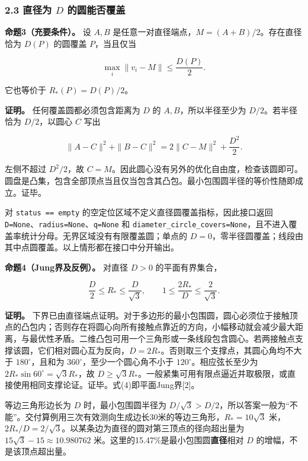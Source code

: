 \documentclass[
  11pt,
  fontset=none]{ctexart}
\begin{document}
\subsubsection{\texorpdfstring{2.3 直径为 \(D\)
的圆能否覆盖}{2.3 直径为 D 的圆能否覆盖}}\label{ux76f4ux5f84ux4e3a-d-ux7684ux5706ux80fdux5426ux8986ux76d6}

\textbf{命题3（充要条件）。} 设 \(A,B\)
是任意一对直径端点，\(M=(A+B)/2\)。存在直径恰为 \(D(P)\) 的圆覆盖
\(P\)，当且仅当

\[
\max_i\|v_i-M\|\le\frac{D(P)}2. \tag{3}
\]

它也等价于 \(R_{\text{*}}(P)=D(P)/2\)。

\textbf{证明。} 任何覆盖圆都必须包含距离为 \(D\) 的
\(A,B\)，所以半径至少为 \(D/2\)。若半径恰为 \(D/2\)，以圆心 \(C\) 写出

\[
\|A-C\|^2+\|B-C\|^2=2\|C-M\|^2+\frac{D^2}{2}.
\]

左侧不超过 \(D^2/2\)，故
\(C=M\)。因此圆心没有另外的优化自由度，检查该圆即可。圆盘是凸集，包含全部顶点当且仅当包含其凸包。最小包围圆半径的等价性随即成立。证毕。

对 \texttt{status\ ==\ \textquotesingle{}empty\textquotesingle{}}
的空定位区域不定义直径圆覆盖指标，因此接口返回
\texttt{D=None}、\texttt{radius=None}、\texttt{q=None} 和
\texttt{diameter\_circle\_covers=None}，且不进入覆盖率统计分母。无界区域没有有限覆盖圆；单点的
\(D=0\)，零半径圆覆盖；线段由其中点圆覆盖。以上情形都在接口中分开输出。

\textbf{命题4（Jung界及反例）。} 对直径 \(D>0\) 的平面有界集合，

\[
\frac D2\le R_{\text{*}}\le\frac D{\sqrt3},\qquad
1\le\frac{2R_{\text{*}}}{D}\le\frac2{\sqrt3}. \tag{4}
\]

\textbf{证明。}
下界已由直径端点证明。对于多边形的最小包围圆，圆心必须位于接触顶点的凸包内；否则存在将圆心向所有接触点靠近的方向，小幅移动就会减少最大距离，与最优性矛盾。二维凸包可用一个三角形或一条线段包含圆心。若两接触点支撑该圆，它们相对圆心互为反向，\(D=2R_{\text{*}}\)。否则取三个支撑点，其圆心角均不大于
\(180^\circ\)，且和为 \(360^\circ\)，至少一个圆心角不小于
\(120^\circ\)。相应弦长至少为
\(2R_{\text{*}}\sin60^\circ=\sqrt3R_{\text{*}}\)，故
\(D\ge\sqrt3R_{\text{*}}\)。一般紧集可用有限点逼近并取极限，或直接使用相同支撑论证。证毕。式(4)即平面Jung界{[}2{]}。

等边三角形边长为 \(D\) 时，最小包围圆半径为
\(D/\sqrt3>D/2\)，所以答案一般为``不能''。交付算例用三次有效测向生成边长30米的等边三角形，\(R_{\text{*}}=10\sqrt3\)
米，\(2R_{\text{*}}/D=2/\sqrt3\)。以某条边为直径的圆对第三顶点的径向超出量为
\(15\sqrt3-15\approx10.980762\)
米。这里的15.47\%是最小包围圆\textbf{直径}相对 \(D\)
的增幅，不是该顶点超出量。
\end{document}
